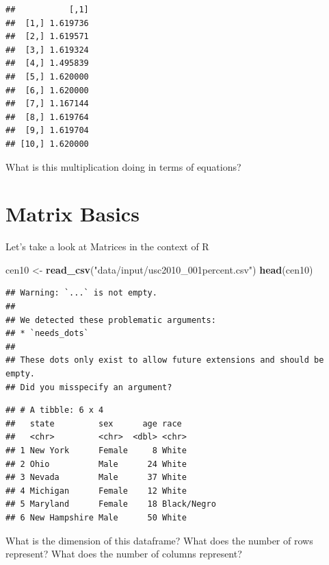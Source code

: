 \documentclass[
]{book}
\newenvironment{Shaded}{\begin{snugshade}}{\end{snugshade}}
\newcommand{\KeywordTok}[1]{\textcolor[rgb]{0.13,0.29,0.53}{\textbf{#1}}}
\newcommand{\NormalTok}[1]{#1}
\newcommand{\OperatorTok}[1]{\textcolor[rgb]{0.81,0.36,0.00}{\textbf{#1}}}
\newcommand{\StringTok}[1]{\textcolor[rgb]{0.31,0.60,0.02}{#1}}
\theoremstyle{definition}
\theoremstyle{definition}
\theoremstyle{definition}
\theoremstyle{definition}
\theoremstyle{remark}
\begin{document}
\begin{Shaded}
\end{Shaded}

\begin{verbatim}
##           [,1]
##  [1,] 1.619736
##  [2,] 1.619571
##  [3,] 1.619324
##  [4,] 1.495839
##  [5,] 1.620000
##  [6,] 1.620000
##  [7,] 1.167144
##  [8,] 1.619764
##  [9,] 1.619704
## [10,] 1.620000
\end{verbatim}

What is this multiplication doing in terms of equations?

\hypertarget{matrix-basics}{%
\section{Matrix Basics}\label{matrix-basics}}

Let's take a look at Matrices in the context of R

\begin{Shaded}
\begin{Highlighting}[]
\NormalTok{cen10 <-}\StringTok{ }\KeywordTok{read_csv}\NormalTok{(}\StringTok{"data/input/usc2010_001percent.csv"}\NormalTok{)}
\KeywordTok{head}\NormalTok{(cen10)}
\end{Highlighting}
\end{Shaded}

\begin{verbatim}
## Warning: `...` is not empty.
## 
## We detected these problematic arguments:
## * `needs_dots`
## 
## These dots only exist to allow future extensions and should be empty.
## Did you misspecify an argument?
\end{verbatim}

\begin{verbatim}
## # A tibble: 6 x 4
##   state         sex      age race       
##   <chr>         <chr>  <dbl> <chr>      
## 1 New York      Female     8 White      
## 2 Ohio          Male      24 White      
## 3 Nevada        Male      37 White      
## 4 Michigan      Female    12 White      
## 5 Maryland      Female    18 Black/Negro
## 6 New Hampshire Male      50 White
\end{verbatim}

What is the dimension of this dataframe? What does the number of rows represent? What does the number of columns represent?
\end{document}
